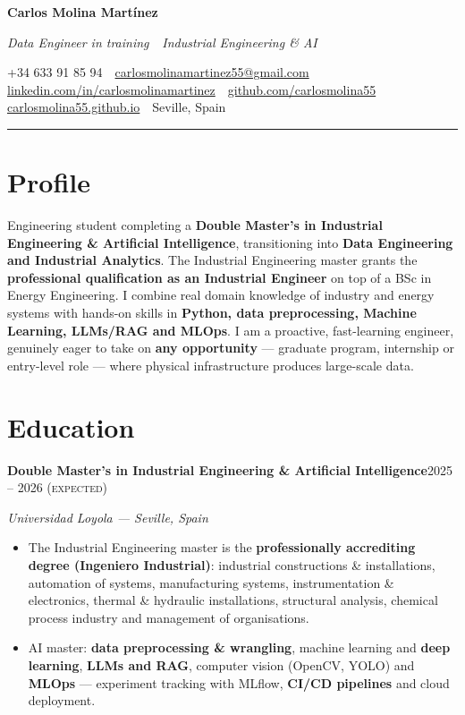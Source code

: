 \documentclass[10.5pt,a4paper]{article}
\newcommand{\entry}[2]{%
  {\textbf{#1}\hfill{\small\color{cobalt}\textsc{#2}}}\par}
\newcommand{\where}[1]{{\small\itshape\color{inkfaint}#1}\par\vspace{2pt}}
\newenvironment{bullets}
  {\begin{itemize}[leftmargin=1.15em,itemsep=1.5pt,parsep=0pt,topsep=2.5pt]
   \renewcommand\labelitemi{{\color{cobalt}\footnotesize$\bullet$}}}
  {\end{itemize}}
\begin{document}
{\Huge\bfseries Carlos Molina Mart\'inez}\par\vspace{4pt}
{\large\color{cobalt}\itshape Data Engineer in training \,\textperiodcentered\, Industrial Engineering \& AI}\par
\vspace{7pt}
{\small\color{inksoft}%
+34 633 91 85 94 \,\textbar\,
\href{mailto:carlosmolinamartinez55@gmail.com}{carlosmolinamartinez55@gmail.com} \,\textbar\,
\href{https://www.linkedin.com/in/carlosmolinamartinez}{linkedin.com/in/carlosmolinamartinez} \,\textbar\,
\href{https://github.com/carlosmolina55}{github.com/carlosmolina55} \,\textbar\,
\href{https://carlosmolina55.github.io}{carlosmolina55.github.io} \,\textbar\,
Seville, Spain}\par
\vspace{6pt}
{\color{hairline}\rule{\linewidth}{0.8pt}}

\section{Profile}
Engineering student completing a \textbf{Double Master's in Industrial Engineering \& Artificial Intelligence}, transitioning into \textbf{Data Engineering and Industrial Analytics}. The Industrial Engineering master grants the \textbf{professional qualification as an Industrial Engineer} on top of a BSc in Energy Engineering. I combine real domain knowledge of industry and energy systems with hands-on skills in \textbf{Python, data preprocessing, Machine Learning, LLMs/RAG and MLOps}. I am a proactive, fast-learning engineer, genuinely eager to take on \textbf{any opportunity} --- graduate program, internship or entry-level role --- where physical infrastructure produces large-scale data.

\section{Education}

\entry{Double Master's in Industrial Engineering \& Artificial Intelligence}{2025 -- 2026 (expected)}
\where{Universidad Loyola --- Seville, Spain}
\begin{bullets}
  \item The Industrial Engineering master is the \textbf{professionally accrediting degree (Ingeniero Industrial)}: industrial constructions \& installations, automation of systems, manufacturing systems, instrumentation \& electronics, thermal \& hydraulic installations, structural analysis, chemical process industry and management of organisations.
  \item AI master: \textbf{data preprocessing \& wrangling}, machine learning and \textbf{deep learning}, \textbf{LLMs and RAG}, computer vision (OpenCV, YOLO) and \textbf{MLOps} --- experiment tracking with MLflow, \textbf{CI/CD pipelines} and cloud deployment.
\end{bullets}
\vspace{5pt}
\end{document}
